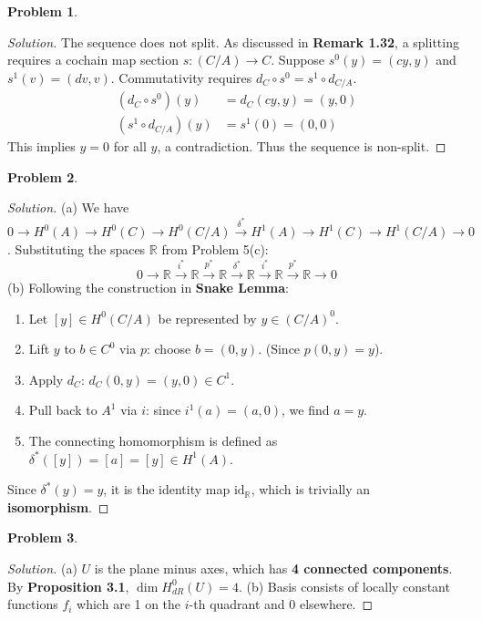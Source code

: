 \documentclass[12pt, a4paper]{article}
\theoremstyle{definition}
\newtheorem{problem}{Problem}
\newenvironment{solution}
  {\renewcommand\qedsymbol{$\blacksquare$}\begin{proof}[Solution]}
  {\end{proof}}
\newcommand{\R}{\mathbb{R}}
\newcommand{\id}{\text{id}}
\begin{document}
\begin{problem}
\end{problem}

\begin{solution}
The sequence does not split. As discussed in \textbf{Remark 1.32}, a splitting requires a cochain map section $s: (C/A) \to C$. 
Suppose $s^0(y) = (cy, y)$ and $s^1(v) = (dv, v)$. Commutativity requires $d_C \circ s^0 = s^1 \circ d_{C/A}$. 
\begin{align*}
    (d_C \circ s^0)(y) &= d_C(cy, y) = (y, 0) \\
    (s^1 \circ d_{C/A})(y) &= s^1(0) = (0, 0)
\end{align*}
This implies $y=0$ for all $y$, a contradiction. Thus the sequence is non-split.
\end{solution}

\begin{problem}
\end{problem}

\begin{solution}
    (a) We have $0 \to H^0(A) \to H^0(C) \to H^0(C/A) \xrightarrow{\delta^*} H^1(A) \to H^1(C) \to H^1(C/A) \to 0$. Substituting the spaces $\R$ from Problem 5(c):
    \[ 0 \to \R \xrightarrow{i^*} \R \xrightarrow{p^*} \R \xrightarrow{\delta^*} \R \xrightarrow{i^*} \R \xrightarrow{p^*} \R \to 0 \]
    (b) Following the construction in \textbf{Snake Lemma}:
    \begin{enumerate}
        \item Let $[y] \in H^0(C/A)$ be represented by $y \in (C/A)^0$.
        \item Lift $y$ to $b \in C^0$ via $p$: choose $b = (0, y)$. (Since $p(0,y) = y$).
        \item Apply $d_C$: $d_C(0, y) = (y, 0) \in C^1$.
        \item Pull back to $A^1$ via $i$: since $i^1(a) = (a, 0)$, we find $a = y$.
        \item The connecting homomorphism is defined as $\delta^*([y]) = [a] = [y] \in H^1(A)$.
    \end{enumerate}
    Since $\delta^*(y) = y$, it is the identity map $\id_\R$, which is trivially an \textbf{isomorphism}.
\end{solution}

\begin{problem}
\end{problem}

\begin{solution}
(a) $U$ is the plane minus axes, which has \textbf{4 connected components}. By \textbf{Proposition 3.1}, $\dim H^0_{dR}(U) = 4$.
(b) Basis consists of locally constant functions $f_i$ which are 1 on the $i$-th quadrant and 0 elsewhere.
\end{solution}
\end{document}
